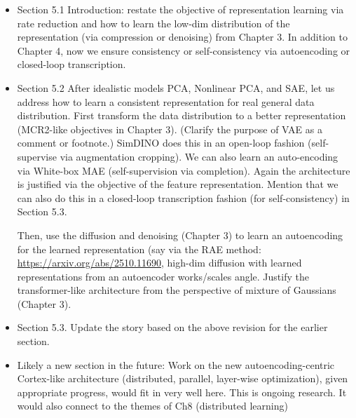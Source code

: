 \documentclass{article}
\begin{document}
\begin{itemize}
    \item Section 5.1 Introduction: restate the objective of representation learning via rate reduction and how to learn the low-dim distribution of the representation (via compression or denoising) from Chapter 3. In addition to Chapter 4, now we ensure consistency or self-consistency via autoencoding or closed-loop transcription. 
    
    \item Section 5.2 After idealistic models PCA, Nonlinear PCA, and SAE, let us address how to learn a consistent representation for real general data distribution. First transform the data distribution to a better representation (MCR2-like objectives in Chapter 3). (Clarify the purpose of VAE as a comment or footnote.) SimDINO does this in an open-loop fashion (self-supervise via augmentation cropping). We can also learn an auto-encoding via White-box MAE (self-supervision via completion). Again the architecture is justified via the objective of the feature representation. 
    Mention that we can also do this in a closed-loop transcription fashion (for self-consistency) in  Section 5.3. 
    
    Then, use the diffusion and denoising (Chapter 3) to learn an autoencoding for the learned representation (say via the RAE method: \url{https://arxiv.org/abs/2510.11690}, high-dim diffusion with learned representations from an autoencoder works/scales angle. Justify the transformer-like architecture from the perspective of mixture of Gaussians (Chapter 3). 

    \item Section 5.3. Update the story based on the above revision for the earlier section. 
    \item Likely a new section in the future: Work on the new autoencoding-centric Cortex-like architecture (distributed, parallel, layer-wise optimization), given appropriate progress, would fit in very well here. This is ongoing research. It would also connect to the themes of Ch8 (distributed learning)


\end{itemize}
\end{document}
